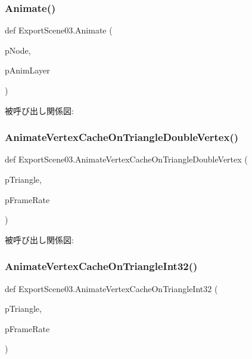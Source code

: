 \subsubsection{\texorpdfstring{Animate()}{Animate()}}
{\footnotesize\ttfamily def Export\+Scene03.\+Animate (\begin{DoxyParamCaption}\item[{}]{p\+Node,  }\item[{}]{p\+Anim\+Layer }\end{DoxyParamCaption})}

被呼び出し関係図\+:
\mbox{\label{namespace_export_scene03_a188a9f5a4ef77fd02d2bd351bf81df1b}} 
\subsubsection{\texorpdfstring{Animate\+Vertex\+Cache\+On\+Triangle\+Double\+Vertex()}{AnimateVertexCacheOnTriangleDoubleVertex()}}
{\footnotesize\ttfamily def Export\+Scene03.\+Animate\+Vertex\+Cache\+On\+Triangle\+Double\+Vertex (\begin{DoxyParamCaption}\item[{}]{p\+Triangle,  }\item[{}]{p\+Frame\+Rate }\end{DoxyParamCaption})}

被呼び出し関係図\+:
\mbox{\label{namespace_export_scene03_a440906a7a98424c5e969382ff35a1565}} 
\subsubsection{\texorpdfstring{Animate\+Vertex\+Cache\+On\+Triangle\+Int32()}{AnimateVertexCacheOnTriangleInt32()}}
{\footnotesize\ttfamily def Export\+Scene03.\+Animate\+Vertex\+Cache\+On\+Triangle\+Int32 (\begin{DoxyParamCaption}\item[{}]{p\+Triangle,  }\item[{}]{p\+Frame\+Rate }\end{DoxyParamCaption})}


